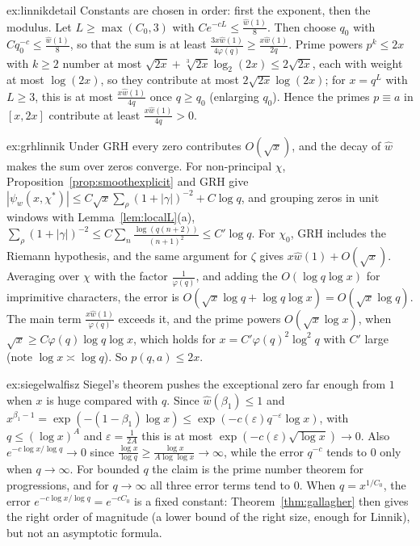 \begin{solution}{ex:linnikdetail}
\idea Constants are chosen in order: first the exponent, then the modulus.
\writeup Let $L\ge\max(C_0,3)$ with $Ce^{-cL}\le\frac{\hat w(1)}8$. Then choose $q_0$ with $Cq_0^{-c}\le\frac{\hat w(1)}8$, so that the sum is at least $\frac{3x\hat w(1)}{4\varphi(q)}\ge\frac{x\hat w(1)}{2q}$. Prime powers $p^k\le2x$ with $k\ge2$ number at most $\sqrt{2x}+\sqrt[3]{2x}\log_2(2x)\le2\sqrt{2x}$, each with weight at most $\log(2x)$, so they contribute at most $2\sqrt{2x}\log(2x)$; for $x=q^L$ with $L\ge3$, this is at most $\frac{x\hat w(1)}{4q}$ once $q\ge q_0$ (enlarging $q_0$). Hence the primes $p\equiv a$ in $[x,2x]$ contribute at least $\frac{x\hat w(1)}{4q}>0$.
\end{solution}

\begin{solution}{ex:grhlinnik}
\idea Under GRH every zero contributes $O(\sqrt x)$, and the decay of $\hat w$ makes the sum over zeros converge.
\writeup For non-principal $\chi$, Proposition~\ref{prop:smoothexplicit} and GRH give $|\psi_w(x,\chi^*)|\le C\sqrt x\sum_\rho(1+|\gamma|)^{-2}+C\log q$, and grouping zeros in unit windows with Lemma~\ref{lem:localL}(a), $\sum_\rho(1+|\gamma|)^{-2}\le C\sum_n\frac{\log(q(n+2))}{(n+1)^2}\le C'\log q$. For $\chi_0$, GRH includes the Riemann hypothesis, and the same argument for $\zeta$ gives $x\hat w(1)+O(\sqrt x)$. Averaging over $\chi$ with the factor $\frac1{\varphi(q)}$, and adding the $O(\log q\log x)$ for imprimitive characters, the error is $O(\sqrt x\log q+\log q\log x)=O(\sqrt x\log q)$. The main term $\frac{x\hat w(1)}{\varphi(q)}$ exceeds it, and the prime powers $O(\sqrt x\log x)$, when $\sqrt x\ge C\varphi(q)\log q\log x$, which holds for $x=C'\varphi(q)^2\log^2q$ with $C'$ large (note $\log x\asymp\log q$). So $p(q,a)\le2x$.
\end{solution}

\begin{solution}{ex:siegelwalfisz}
\idea Siegel's theorem pushes the exceptional zero far enough from $1$ when $x$ is huge compared with $q$.
\writeup Since $\hat w(\beta_1)\le1$ and $x^{\beta_1-1}=\exp(-(1-\beta_1)\log x)\le\exp(-c(\varepsilon)q^{-\varepsilon}\log x)$, with $q\le(\log x)^A$ and $\varepsilon=\frac1{2A}$ this is at most $\exp(-c(\varepsilon)\sqrt{\log x})\to0$. Also $e^{-c\log x/\log q}\to0$ since $\frac{\log x}{\log q}\ge\frac{\log x}{A\log\log x}\to\infty$, while the error $q^{-c}$ tends to $0$ only when $q\to\infty$. For bounded $q$ the claim is the prime number theorem for progressions, and for $q\to\infty$ all three error terms tend to $0$. When $q=x^{1/C_0}$, the error $e^{-c\log x/\log q}=e^{-cC_0}$ is a fixed constant: Theorem~\ref{thm:gallagher} then gives the right order of magnitude (a lower bound of the right size, enough for Linnik), but not an asymptotic formula.
\end{solution}

